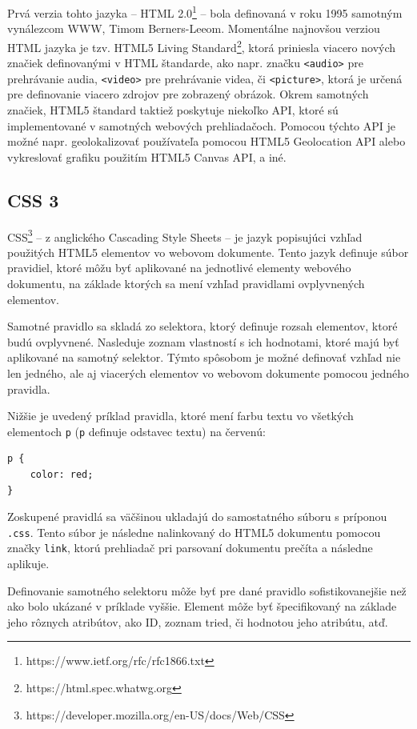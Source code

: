 Prvá verzia tohto jazyka -- HTML 2.0\footnote{https://www.ietf.org/rfc/rfc1866.txt} -- bola definovaná v roku 1995 samotným vynálezcom WWW, Timom Berners-Leeom. Momentálne najnovšou verziou HTML jazyka je tzv. HTML5 Living Standard\footnote{https://html.spec.whatwg.org}, ktorá priniesla viacero nových značiek definovanými v HTML štandarde, ako napr. značku \texttt{<audio>} pre prehrávanie audia, \texttt{<video>} pre prehrávanie videa, či \texttt{<picture>}, ktorá je určená pre definovanie viacero zdrojov pre zobrazený obrázok. Okrem samotných značiek, HTML5 štandard taktiež poskytuje niekoľko API, ktoré sú implementované v samotných webových prehliadačoch. Pomocou týchto API je možné napr. geolokalizovať používateľa pomocou HTML5 Geolocation API alebo vykreslovať grafiku použitím HTML5 Canvas API, a iné.

\subsection {CSS 3}
CSS\footnote{https://developer.mozilla.org/en-US/docs/Web/CSS} -- z anglického Cascading Style Sheets -- je jazyk popisujúci vzhľad použitých HTML5 elementov vo webovom dokumente. Tento jazyk definuje súbor pravidiel, ktoré môžu byť aplikované na jednotlivé elementy webového dokumentu, na základe ktorých sa mení vzhľad pravidlami ovplyvnených elementov.

Samotné pravidlo sa skladá zo selektora, ktorý definuje rozsah elementov, ktoré budú ovplyvnené. Nasleduje zoznam vlastností s ich hodnotami, ktoré majú byť aplikované na samotný selektor. Týmto spôsobom je možné definovať vzhľad nie len jedného, ale aj viacerých elementov vo webovom dokumente pomocou jedného pravidla.

Nižšie je uvedený príklad pravidla, ktoré mení farbu textu vo všetkých elementoch \texttt{p} (\texttt{p} definuje odstavec textu) na červenú:

\begin{lstlisting}
p {
    color: red;
}
\end{lstlisting}

Zoskupené pravidlá sa väčšinou ukladajú do samostatného súboru s príponou \texttt{.css}. Tento súbor je následne nalinkovaný do HTML5 dokumentu pomocou značky \texttt{link}, ktorú prehliadač pri parsovaní dokumentu prečíta a následne aplikuje.

Definovanie samotného selektoru môže byť pre dané pravidlo sofistikovanejšie než ako bolo ukázané v príklade vyššie. Element môže byť špecifikovaný na základe jeho rôznych atribútov, ako ID, zoznam tried, či hodnotou jeho atribútu, atď.


